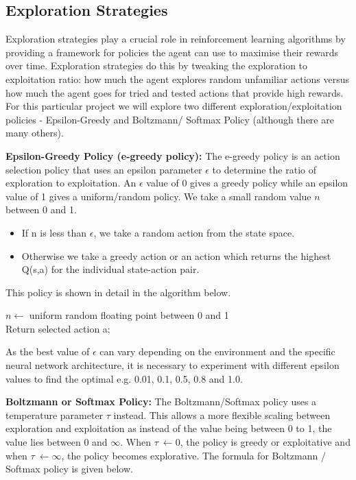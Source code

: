 \documentclass{article}
\begin{document}
\subsection{Exploration Strategies}

Exploration strategies play a crucial role in reinforcement learning algorithms by providing a framework for policies the agent can use to maximise their rewards over time. Exploration strategies do this by tweaking the exploration to exploitation ratio: how much the agent explores random unfamiliar actions versus how much the agent goes for tried and tested actions that provide high rewards. For this particular project we will explore two different exploration/exploitation policies - Epsilon-Greedy and Boltzmann/ Softmax Policy (although there are many others).

\textbf{Epsilon-Greedy Policy (e-greedy policy):} The e-greedy policy is an action selection policy that uses an epsilon parameter $\epsilon$ to determine the ratio of exploration to exploitation. An $\epsilon$ value of 0 gives a greedy policy while an epsilon value of 1 gives a uniform/random policy. We take a small random value $n$ between 0 and 1. 
\begin{itemize}
    \item If n is less than $\epsilon$, we take a random action from the state space.
    \item Otherwise we take a greedy action or an action which returns the highest Q(s,a) for the individual state-action pair.
\end{itemize}

This policy is shown in detail in the algorithm below.
\begin{algorithm}[H]
$n \leftarrow$ uniform random floating point between 0 and 1\;\\
Return selected action a; 
\end{algorithm}


As the best value of $\epsilon$ can vary depending on the environment and the specific neural network architecture, it is necessary to experiment with different epsilon values to find the optimal e.g. 0.01, 0.1, 0.5, 0.8 and 1.0. 


\textbf{Boltzmann or Softmax Policy:} The Boltzmann/Softmax policy uses a temperature parameter $\tau$ instead. This allows a more flexible scaling between exploration and exploitation as instead of the value being between 0 to 1, the value lies between 0 and \(\infty\). When \(\tau\ \gets 0\), the policy is greedy or exploitative and when \(\tau\ \gets \infty\), the policy becomes explorative. The formula for Boltzmann / Softmax policy is given below. 
 
\end{document}
